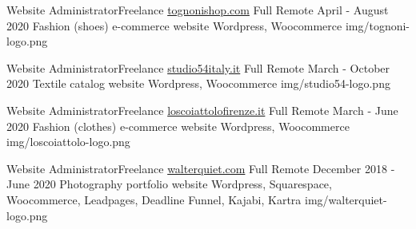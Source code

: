 
\begin{cventries}

  \logocventry
    {Website Administrator{\enskip\cdotp\enskip}Freelance}
    {\href{https://www.tognonishop.com}{tognonishop.com}}
    {Full Remote}
    {April - August 2020}
    {
      \cvexp
        {Fashion (shoes) e-commerce website}
        {}
        {Wordpress, Woocommerce}
    }
    {img/tognoni-logo.png}

  \logocventry
    {Website Administrator{\enskip\cdotp\enskip}Freelance}
    {\href{https://www.studio54italy.it}{studio54italy.it}}
    {Full Remote}
    {March - October 2020}
    {
      \cvexp
        {Textile catalog website}
        {}
        {Wordpress, Woocommerce}
    }
    {img/studio54-logo.png}

  \logocventry
    {Website Administrator{\enskip\cdotp\enskip}Freelance}
    {\href{https://www.loscoiattolofirenze.it}{loscoiattolofirenze.it}}
    {Full Remote}
    {March - June 2020}
    {
      \cvexp
        {Fashion (clothes) e-commerce website}
        {}
        {Wordpress, Woocommerce}
    }
    {img/loscoiattolo-logo.png}

  \logocventry
    {Website Administrator{\enskip\cdotp\enskip}Freelance}
    {\href{https://www.walterquiet.com}{walterquiet.com}}
    {Full Remote}
    {December 2018 - June 2020}
    {
      \cvexp
        {Photography portfolio website}
        {}
        {Wordpress, Squarespace, Woocommerce, Leadpages, Deadline Funnel, Kajabi, Kartra}
    }
    {img/walterquiet-logo.png}

\end{cventries}